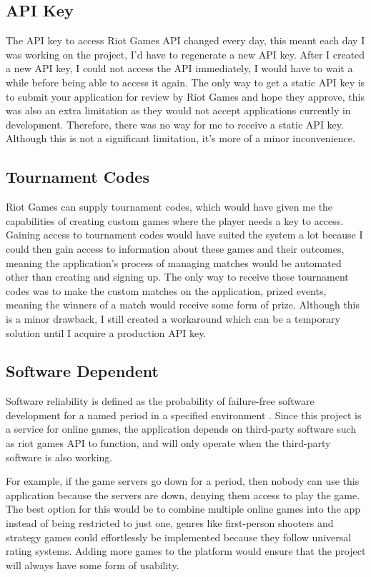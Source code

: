 \subsection{API Key}
The API key to access Riot Games API changed every day, this meant each day I was working on the project, I'd have to regenerate a new API key. After I created a new API key, I could not access the API immediately, I would have to wait a while before being able to access it again. The only way to get a static API key is to submit your application for review by Riot Games and hope they approve, this was also an extra limitation as they would not accept applications currently in development. Therefore, there was no way for me to receive a static API key. Although this is not a significant limitation, it's more of a minor inconvenience.
\subsection{Tournament Codes}
Riot Games can supply tournament codes, which would have given me the capabilities of creating custom games where the player needs a key to access. Gaining access to tournament codes would have suited the system a lot because I could then gain access to information about these games and their outcomes, meaning the application's process of managing matches would be automated other than creating and signing up. The only way to receive these tournament codes was to make the custom matches on the application, prized events, meaning the winners of a match would receive some form of prize. Although this is a minor drawback, I still created a workaround which can be a temporary solution until I acquire a production API key.
\subsection{Software Dependent}
Software reliability is defined as the probability of failure-free software development for a named period in a specified environment \cite{huang2007assessment}. Since this project is a service for online games, the application depends on third-party software such as riot games API to function, and will only operate when the third-party software is also working. 

For example, if the game servers go down for a period, then nobody can use this application because the servers are down, denying them access to play the game. The best option for this would be to combine multiple online games into the app instead of being restricted to just one, genres like first-person shooters and strategy games could effortlessly be implemented because they follow universal rating systems. Adding more games to the platform would ensure that the project will always have some form of usability.\hfill \break

